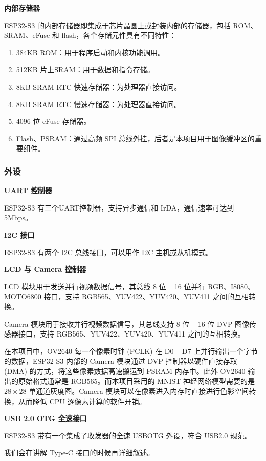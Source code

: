 \documentclass[a4paper,12pt]{ctexart}
\begin{document}
\textbf{内部存储器}

ESP32-S3 的内部存储器即集成于芯片晶圆上或封装内部的存储器，包括 ROM、SRAM、eFuse 和 flash，各个存储元件具有不同特性：

\begin{enumerate}
    \item 384KB ROM：用于程序启动和内核功能调用。
    \item 512KB 片上SRAM：用于数据和指令存储。
    \item 8KB SRAM RTC 快速存储器：为处理器直接访问。
    \item 8KB SRAM RTC 慢速存储器：为处理器直接访问。
    \item 4096 位 eFuse 存储器。
    \item Flash、PSRAM：通过高频 SPI 总线外挂，后者是本项目用于图像缓冲区的重要组件。
\end{enumerate}

\subsubsection{外设}

\textbf{UART 控制器}

ESP32-S3 有三个UART控制器，支持异步通信和 IrDA，通信速率可达到 5Mbps。

\textbf{I2C 接口}

ESP32-S3 有两个 I2C 总线接口，可以用作 I2C 主机或从机模式。

\textbf{LCD 与 Camera 控制器}

LCD 模块用于发送并行视频数据信号，其总线 8 位 ~ 16 位并行 RGB、I8080、MOTO6800 接口，支持 RGB565、YUV422、YUV420、YUV411 之间的互相转换。

Camera 模块用于接收并行视频数据信号，其总线支持 8 位 ~ 16 位 DVP 图像传感器接口，支持 RGB565、YUV422、YUV420、YUV411 之间的互相转换。

在本项目中，OV2640 每一个像素时钟 (PCLK) 在 D0 ~ D7 上并行输出一个字节的数据，ESP32-S3 内部的 Camera 模块通过 DVP 控制器以硬件直接存取 (DMA) 的方式，将这些像素数据高速搬运到 PSRAM 内存中。此外 OV2640 输出的原始格式通常是 RGB565。而本项目采用的 MNIST 神经网络模型需要的是 $28\times28$ 单通道灰度图。Camera 模块可以在像素进入内存时直接进行色彩空间转换，从而降低 CPU 逐像素计算的软件开销。


\textbf{USB 2.0 OTG 全速接口}

ESP32-S3 带有一个集成了收发器的全速 USBOTG 外设，符合 USB2.0 规范。

我们会在讲解 Type-C 接口的时候再详细叙述。
\end{document}

